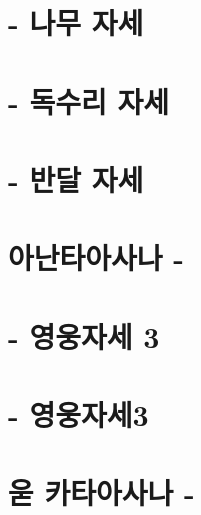 \documentclass[12pt, a4paper, oneside]{book}
\let\stdsection\section
\renewcommand\section{\newpage\stdsection}
\begin{document}
%
	\section{ - 나무 자세}

%
	\section{ - 독수리 자세}

%
	\section{ - 반달 자세}

%
	\section{아난타아사나 - }


%
	\section{ - 영웅자세 3}

%
	\section{ - 영웅자세3}



%
	\section{욷 카타아사나 - }
\end{document}
